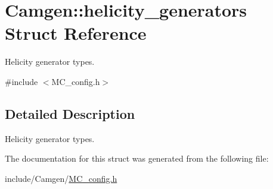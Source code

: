 \hypertarget{a00274}{}\section{Camgen\+:\+:helicity\+\_\+generators Struct Reference}
\label{a00274}


Helicity generator types.  




{\ttfamily \#include $<$M\+C\+\_\+config.\+h$>$}



\subsection{Detailed Description}
Helicity generator types. 

The documentation for this struct was generated from the following file\+:\begin{DoxyCompactItemize}
\item 
include/\+Camgen/\hyperlink{a00690}{M\+C\+\_\+config.\+h}\end{DoxyCompactItemize}
